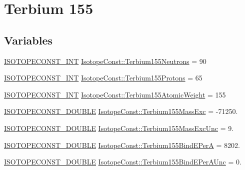 \hypertarget{group___isotope_const-_terbium-_tb155}{}\section{Terbium 155}
\label{group___isotope_const-_terbium-_tb155}
\subsection*{Variables}
\begin{DoxyCompactItemize}
\item 
\mbox{\hyperlink{group___isotope_const-_macros_ga5f18360b3e99483a35c32d789e62621c}{I\+S\+O\+T\+O\+P\+E\+C\+O\+N\+S\+T\+\_\+\+I\+NT}} \mbox{\hyperlink{group___isotope_const-_terbium-_tb155_gae0cd97f41bbf48a2e2b05094b4e7dd66}{Isotope\+Const\+::\+Terbium155\+Neutrons}} = 90
\item 
\mbox{\hyperlink{group___isotope_const-_macros_ga5f18360b3e99483a35c32d789e62621c}{I\+S\+O\+T\+O\+P\+E\+C\+O\+N\+S\+T\+\_\+\+I\+NT}} \mbox{\hyperlink{group___isotope_const-_terbium-_tb155_ga9bdd4dc31a78b942253f1deb1c20e3ae}{Isotope\+Const\+::\+Terbium155\+Protons}} = 65
\item 
\mbox{\hyperlink{group___isotope_const-_macros_ga5f18360b3e99483a35c32d789e62621c}{I\+S\+O\+T\+O\+P\+E\+C\+O\+N\+S\+T\+\_\+\+I\+NT}} \mbox{\hyperlink{group___isotope_const-_terbium-_tb155_ga927d15392e47d49163a9696ee2dbac24}{Isotope\+Const\+::\+Terbium155\+Atomic\+Weight}} = 155
\item 
\mbox{\hyperlink{group___isotope_const-_macros_ga8f45a7272ce02c0b4c65c44636ed719a}{I\+S\+O\+T\+O\+P\+E\+C\+O\+N\+S\+T\+\_\+\+D\+O\+U\+B\+LE}} \mbox{\hyperlink{group___isotope_const-_terbium-_tb155_ga7786ff538463e466750545dcabf0daba}{Isotope\+Const\+::\+Terbium155\+Mass\+Exc}} = -\/71250.
\item 
\mbox{\hyperlink{group___isotope_const-_macros_ga8f45a7272ce02c0b4c65c44636ed719a}{I\+S\+O\+T\+O\+P\+E\+C\+O\+N\+S\+T\+\_\+\+D\+O\+U\+B\+LE}} \mbox{\hyperlink{group___isotope_const-_terbium-_tb155_gafd67fe88b84b4673fccf3f8f480ea2c3}{Isotope\+Const\+::\+Terbium155\+Mass\+Exc\+Unc}} = 9.
\item 
\mbox{\hyperlink{group___isotope_const-_macros_ga8f45a7272ce02c0b4c65c44636ed719a}{I\+S\+O\+T\+O\+P\+E\+C\+O\+N\+S\+T\+\_\+\+D\+O\+U\+B\+LE}} \mbox{\hyperlink{group___isotope_const-_terbium-_tb155_ga1bf795f78d33aed2f300270c40ca3eba}{Isotope\+Const\+::\+Terbium155\+Bind\+E\+PerA}} = 8202.
\item 
\mbox{\hyperlink{group___isotope_const-_macros_ga8f45a7272ce02c0b4c65c44636ed719a}{I\+S\+O\+T\+O\+P\+E\+C\+O\+N\+S\+T\+\_\+\+D\+O\+U\+B\+LE}} \mbox{\hyperlink{group___isotope_const-_terbium-_tb155_gac1e2275b59ec218e4dc6b30286c65c15}{Isotope\+Const\+::\+Terbium155\+Bind\+E\+Per\+A\+Unc}} = 0.

\end{DoxyCompactItemize}
